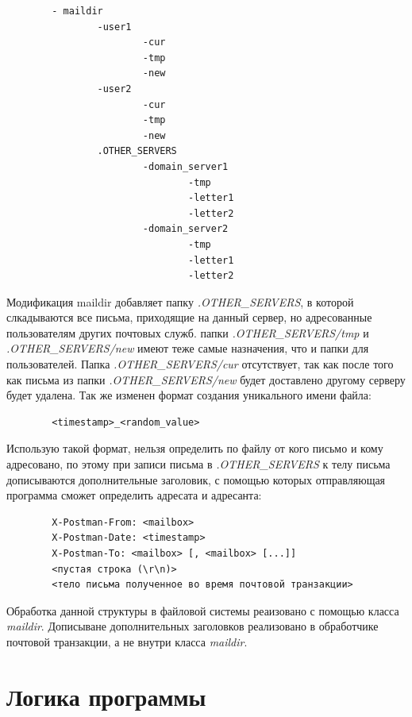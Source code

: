 \documentclass[a4paper,12pt]{report}
\begin{document}
    \begin{verbatim}
        - maildir
                -user1
                        -cur
                        -tmp
                        -new
                -user2
                        -cur
                        -tmp
                        -new
                .OTHER_SERVERS
                        -domain_server1
                                -tmp
                                -letter1
                                -letter2
                        -domain_server2
                                -tmp
                                -letter1
                                -letter2
    \end{verbatim}

    Модификация maildir добавляет папку \textit{.OTHER\_SERVERS}, в которой слкадываются все письма, приходящие на данный сервер, но адресованные пользователям других почтовых служб. папки \textit{.OTHER\_SERVERS/tmp} и  \textit{.OTHER\_SERVERS/new} имеют теже самые назначения, что и папки для пользователей. Папка \textit{.OTHER\_SERVERS/cur} отсутствует, так как после того как письма из папки \textit{.OTHER\_SERVERS/new} будет доставлено другому серверу будет удалена. Так же изменен формат создания уникального имени файла:
    \begin{verbatim}
        <timestamp>_<random_value>
    \end{verbatim}
    Использую такой формат, нельзя определить по файлу от кого письмо и кому адресовано, по этому при записи письма в \textit{.OTHER\_SERVERS} к телу письма дописываются дополнительные заголовик, с помощью которых отправляющая программа сможет определить адресата и адресанта:
    \begin{verbatim}
        X-Postman-From: <mailbox>
        X-Postman-Date: <timestamp>
        X-Postman-To: <mailbox> [, <mailbox> [...]]
        <пустая строка (\r\n)>
        <тело письма полученное во время почтовой транзакции>
    \end{verbatim}
    
    Обработка данной структуры в файловой системы реаизовано с помощью класса \textit{maildir}. Дописыване дополнительных заголовков реализовано в обработчике почтовой транзакции, а не внутри класса \textit{maildir}.

\section{Логика программы}
\end{document}
